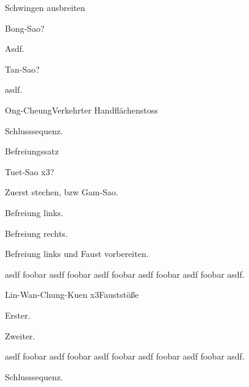 
\begin{WTSatz}{Schwingen ausbreiten}%

	
	\begin{WTSatzTeil}{Bong-Sao}{?}
		
		Asdf.
	\end{WTSatzTeil}
	\begin{WTSatzTeil}{Tan-Sao}{?}
		
		asdf.
	\end{WTSatzTeil}
	\begin{WTSatzTeil}{Ong-Cheung}{Verkehrter Handfl\"achenstoss}
		
		Schlusssequenz.
	\end{WTSatzTeil}
\end{WTSatz}


\begin{WTSatz}{Befreiungssatz}%

	
	\begin{WTSatzTeil}{Tuet-Sao x3}{?}
	
		Zuerst stechen, bzw Gam-Sao.
		
		
		Befreiung links.
		
		
		Befreiung rechts.
		
		
		Befreiung links und Faust vorbereiten.
		

		asdf foobar asdf foobar asdf foobar asdf foobar asdf foobar asdf.
	\end{WTSatzTeil}
	\begin{WTSatzTeil}{Lin-Wan-Chung-Kuen x3}{Faustst\"o{\ss}e}
		
		Erster.
	
		
		Zweiter.
		
		
		asdf foobar asdf foobar asdf foobar asdf foobar asdf foobar asdf.
		
		Schlusssequenz.
	\end{WTSatzTeil}
\end{WTSatz}




